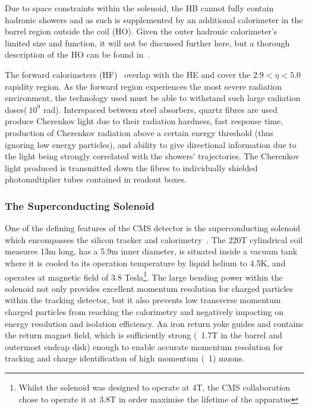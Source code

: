 Due to space constraints within the solenoid, the HB cannot fully contain hadronic showers and as such is supplemented by an additional calorimeter in the barrel region outside the coil (HO). Given the outer hadronic calorimeter's limited size and function, it will not be discussed further here, but a thorough description of the HO can be found in~\cite{HO}.

The forward calorimeters (HF)~\cite{HF} overlap with the HE and cover the $2.9 < \eta < 5.0$ rapidity region.
As the forward region experiences the most severe radiation environment, the technology used must be able to withstand such large radiation doses($~10^{9}$ rad). 
Interspaced between steel absorbers, quartz fibres are used produce Cherenkov light due to their radiation hardness, fast response time, production of Cherenkov radiation above a certain energy threshold (thus ignoring low energy particles), and ability to give directional information due to the light being strongly correlated with the showers' trajectories.
The Cherenkov light produced is transmitted down the fibres to individually shielded photomultiplier tubes contained in readout boxes.


\subsubsection{The Superconducting Solenoid}\label{subsubsec:magnet}
One of the defining features of the CMS detector is the superconducting solenoid which encompasses the silicon tracker and calorimetry~\cite{Acquistapace:1997fm,Herve:2000}.
The 220T cylindrical coil measures 13m long, has a 5.9m inner diameter, is situated inside a vacuum tank where it is cooled to its operation temperature by liquid helium to 4.5K, and operates at magnetic field of 3.8 Tesla\footnote{Whilst the solenoid was designed to operate at 4T, the CMS collaboration chose to operate it at 3.8T in order maximise the lifetime of the apparatus}.
The large bending power within the solenoid not only provides excellent momentum resolution for charged particles within the tracking detector, but it also prevents low transverse momentum charged particles from reaching the calorimetry and negatively impacting on energy resolution and isolation efficiency.
An iron return yoke guides and contains the return magnet field, which is sufficiently strong (~1.7T in the barrel and outermost endcap disk) enough to enable accurate momentum resolution for tracking and charge identification of high momentum (~1\TeVc) muons.

